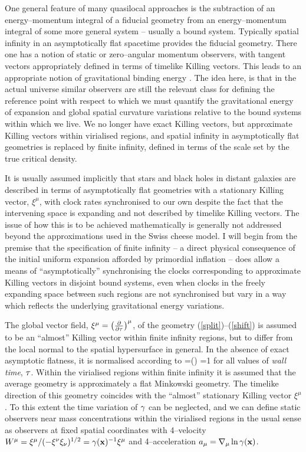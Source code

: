 \documentclass[12pt]{article}
\begin{document}
One general feature of many quasilocal approaches is the subtraction of an
energy--momentum integral of a fiducial geometry from an energy--momentum
integral of some more general system -- usually a bound system. Typically
spatial infinity in an asymptotically flat spacetime provides the fiducial
geometry. There one has a notion of static or
zero--angular momentum observers, with tangent
vectors appropriately defined in terms of timelike Killing vectors. This leads
to an appropriate notion of gravitational binding energy \cite{KLB}.
The idea here, is that in the actual universe similar observers are still
the relevant class for defining the reference
point with respect to which we must quantify the gravitational energy
of expansion and global spatial curvature variations relative to the bound
systems within which we live. We no longer have exact Killing vectors, but
approximate Killing vectors within virialised regions, and spatial
infinity in asymptotically flat geometries is replaced by finite infinity,
defined in terms of the scale set by the true critical density.

It is usually assumed implicitly that stars and black holes in distant galaxies
are described in terms of asymptotically flat geometries with a stationary
Killing vector, $\xi^\mu$, with clock rates synchronised to our own
despite the fact that the intervening space is expanding and
not described by timelike Killing vectors. The issue of how this is to be
achieved mathematically is generally not addressed beyond the
approximations used in the Swiss cheese model. I will begin from the premise
that the specification of finite infinity -- a direct physical consequence
of the initial uniform expansion afforded by primordial inflation -- does
allow a means of ``asymptotically'' synchronising the clocks corresponding
to approximate Killing vectors in disjoint bound systems, even when
clocks in the freely expanding space between such regions are not
synchronised but vary in a way which reflects the underlying gravitational
energy variations.

The global vector field, $\xi^\mu=\left(\partial\over\partial\tau\right)^\mu$, of the
geometry (\ref{split})--(\ref{shift}) is assumed to be an ``almost'' Killing
vector within finite infinity regions, but to differ from the local normal
to the spatial hypersurface in general. In the absence of exact
asymptotic flatness, it is normalised according to
\beq
{}\Z{\Fi}=\ave{\ga(\tc,\bx)}\Z{\Fi}\equiv\ga\Z{\Fi}(\tc)
=1
\eeq
for all values of {\em wall time}, $\tau$. Within the virialised regions
within finite infinity it is assumed that the average geometry is
approximately a flat Minkowski geometry. The timelike direction of this
geometry coincides with the ``almost'' stationary Killing vector $\xi^\mu$.
To this extent the time variation of $\gamma$ can be neglected, and we can
define static observers near mass concentrations within the virialised
regions in the usual sense as observers at fixed spatial coordinates with
4--velocity $W^\mu=\xi^\mu/(-\xi^\nu\xi_\nu)^{1/2}=\gamma({\mathbf x})^{-1}\xi^\mu$ and
4--acceleration $a_\mu=\nabla_\mu\ln\gamma({\mathbf x})$.
\end{document}
